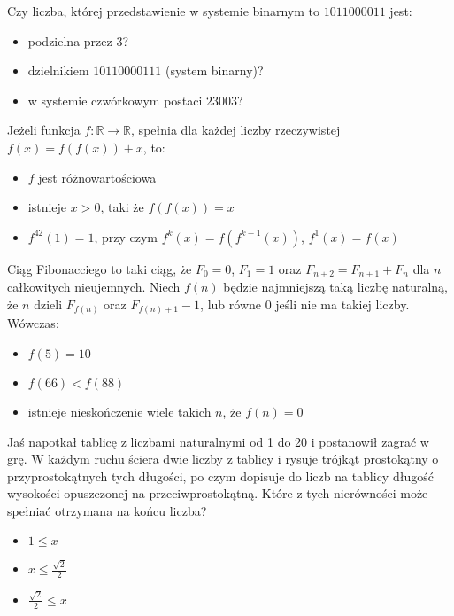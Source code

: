 \documentclass[12pt, a4paper]{article}
\newcommand{\R}{\mathbb{R}}
\newcommand{\question}[1]{\normalitem \begin{samepage}#1 \end{samepage}}
\newcommand{\questionwithasterix}[1]{ \asterixitem \begin{samepage}#1 \vspace{6cm}\end{samepage}}
\begin{document}
\begin{enumerate}
	\question {
		Czy liczba, której przedstawienie w systemie binarnym to $1011000011$ jest:
	
		\begin{itemize}
			\item podzielna przez $3$?
			\item dzielnikiem $10110000111$ (system binarny)?
			\item w systemie czwórkowym postaci $23003$?
		\end{itemize}
	}
	
	\question {
		Jeżeli funkcja $f: \R \rightarrow \R$, spełnia dla każdej liczby rzeczywistej $f(x) = f(f(x)) + x$, to:
	
		\begin{itemize}
			\item $f$ jest różnowartościowa
			\item istnieje $x > 0$, taki że $f(f(x)) = x$
			\item $f^{42}(1) = 1$, przy czym $f^{k}(x) = f(f^{k-1}(x))$, $f^1(x) = f(x)$
		\end{itemize}
	}
	
	\question {
		Ciąg Fibonacciego to taki ciąg, że $F_0 = 0$, $F_1 = 1$ oraz $F_{n+2} = F_{n+1} + F_n$ dla $n$ całkowitych nieujemnych. Niech $f(n)$ będzie najmniejszą taką liczbę naturalną, że $n$ dzieli $F_{f(n)}$ oraz $F_{f(n)+1}-1$, lub równe 0 jeśli nie ma takiej liczby. Wówczas:
	
		\begin{itemize}
			\item $f(5) = 10$
			\item $f(66) < f(88)$
			\item istnieje nieskończenie wiele takich $n$, że $f(n) = 0$
		\end{itemize}
	}
	
	\questionwithasterix{
		Jaś napotkał tablicę z liczbami naturalnymi od 1 do 20 i postanowił zagrać w grę. W każdym ruchu ściera dwie liczby z tablicy i rysuje trójkąt prostokątny o przyprostokątnych tych długości, po czym dopisuje do liczb na tablicy długość wysokości opuszczonej na przeciwprostokątną. Które z tych nierówności może spełniać otrzymana na końcu liczba?
		
		\begin{itemize}
			\item $1 \leq x$
			\item $x \leq \frac{\sqrt{2}}{2}$
			\item $\frac{\sqrt{2}}{2} \leq x$
		\end{itemize}
	}
	

\end{enumerate}
\end{document}
